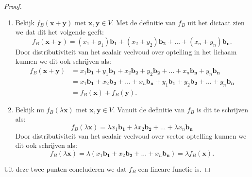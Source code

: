 \documentclass[12pt, a4paper]{article}
\begin{document}
\begin{enumerate}[(a).]
        \begin{proof}\leavevmode
            \begin{enumerate}[1.]
                \item 
                Bekijk $f_B(\mathbf{x} + \mathbf{y})$ met $\mathbf{x}, \mathbf{y} \in V$. Met de definitie van $f_B$ uit het dictaat zien we dat dit het volgende geeft:
                \begin{equation}
                    f_B(\mathbf{x} + \mathbf{y}) = (x_1 + y_1) \mathbf{b_1} + (x_2 + y_2) \mathbf{b_2} + \ldots + (x_n + y_n) \mathbf{b_n}.   
                \end{equation}
                Door distributiviteit van het scalair veelvoud over optelling in het lichaam kunnen we dit ook schrijven als:
                \begin{align*}
                    f_B(\mathbf{x} + \mathbf{y}) & = 
                    x_1 \mathbf{b_1} + y_1 \mathbf{b_1} + 
                    x_2 \mathbf{b_2} + y_2 \mathbf{b_2} + 
                    \ldots + x_n \mathbf{b_n} + y_n \mathbf{b_n} \\
                    & = 
                    x_1 \mathbf{b_1} + x_2 \mathbf{b_2} + \ldots + x_n \mathbf{b_n} +
                    y_1 \mathbf{b_1} + y_2 \mathbf{b_2} + \ldots + y_n \mathbf{b_n} \\
                    & = f_B(\mathbf{x}) + f_B(\mathbf{y}).
                \end{align*}

                \item 
                Bekijk nu $f_B(\lambda \mathbf{x})$ met $\mathbf{x}, \mathbf{y} \in V$. Vanuit de definitie van $f_B$ is dit te schrijven als:
                \begin{equation}
                    f_B(\lambda \mathbf{x})= 
                    \lambda x_1 \mathbf{b_1} + \lambda x_2 \mathbf{b_2} + \ldots + \lambda x_n \mathbf{b_n}
                \end{equation}
                Door distributiviteit van het scalair veelvoud over vector optelling kunnen we dit ook schrijven als:
                \begin{equation}
                    f_B(\lambda \mathbf{x})= 
                    \lambda ( x_1 \mathbf{b_1} + x_2 \mathbf{b_2} + \ldots + x_n \mathbf{b_n}) 
                    = \lambda f_B(\textbf{x}). 
                \end{equation}
            \end{enumerate}
            Uit deze twee punten concluderen we dat $f_B$ een lineare functie is.


\end{proof}
\end{enumerate}
\end{document}
